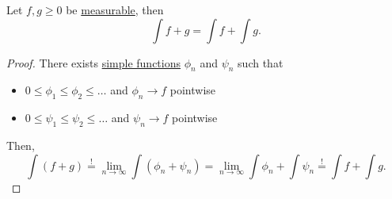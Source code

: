 \begin{corollary}\label{col:linearity-of-nonnegative-integral}
	Let \(f, g \geq 0\) be \hyperref[def:measurable-function]{measurable}, then
	\[
		\int f+g = \int f+\int g.
	\]
\end{corollary}
\begin{proof}
	There exists \hyperref[def:simple-function]{simple functions} \(\phi _{n}\) and \(\psi _{n}\) such that
	\begin{itemize}
		\item \(0\leq \phi _1 \leq \phi _2\leq \ldots  \) and \(\phi _{n}\to f\) pointwise
		\item \(0\leq \psi _1 \leq \psi _2\leq \ldots  \) and \(\psi _{n}\to f\) pointwise
	\end{itemize}

	Then,
	\[
		\int (f+g)\overset{\hyperref[thm:MCT]{!}}{=}\lim\limits_{n \to \infty}\int (\phi _{n} + \psi _{n}) = \lim\limits_{n \to \infty} \int \phi _{n} + \int \psi _{n}\overset{\hyperref[thm:MCT]{!}}{=} \int f + \int g.
	\]
\end{proof}
